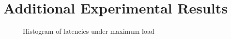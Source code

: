 \appendix

\chapter{Additional Experimental Results}
\begin{figure}[p]
    \centering
    

    \caption[Experiment 1 - Histogram of latencies under maximum load.]{Histogram of latencies under maximum load}
    \label{fig:exp:01:hist-latency-traefik}
\end{figure}


